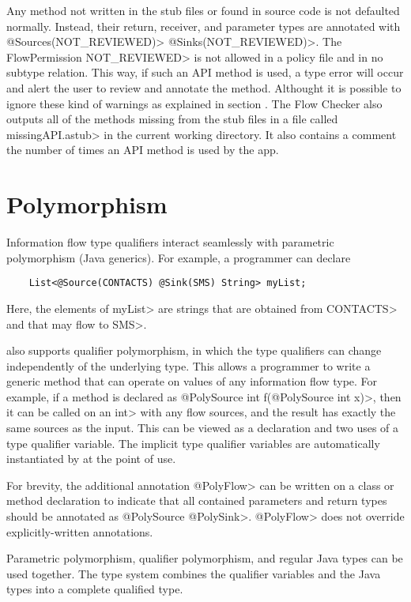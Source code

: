 Any method not written in the stub files or found in source code is not defaulted normally. 
 Instead, their return, receiver, and parameter types are annotated with \<@Sources(NOT\_REVIEWED)> 
 \<@Sinks(NOT\_REVIEWED)>.  The FlowPermission \<NOT\_REVIEWED> is not allowed 
 in a policy file and in no subtype relation.  This way, if such an API method is used, a type error
  will occur and alert the user to review and annotate the method. Althought it is possible to ignore these kind of warnings as explained in section .
  The Flow Checker also outputs all of the methods missing from the stub files in
  a file called \<missingAPI.astub> in the current working directory. It also 
  contains a comment the number of times an API method is used by the app.

\section{Polymorphism \label{sec:polyflowsources}}


Information flow type qualifiers interact seamlessly with parametric polymorphism (Java
generics).  For example, a programmer can declare

\begin{Verbatim}
    List<@Source(CONTACTS) @Sink(SMS) String> myList;
\end{Verbatim}
\noindent
Here, the elements of \<myList> are strings
that are obtained from \<CONTACTS> and that may flow to \<SMS>.

\TheFlowChecker also supports qualifier polymorphism, in
which the type qualifiers can change independently of the underlying type.
This allows a programmer to write a generic method that can operate on values of
any information flow type.
For example, if a method is declared as
\<@PolySource int f(@PolySource int x)>, then it can be called on an \<int>
with any flow sources, and the result has exactly the same sources as the
input.  This can be viewed as a declaration and two uses of a type
qualifier variable.  The implicit type qualifier variables are
automatically instantiated by \theFlowChecker at the point of use.

For brevity,
the additional
annotation \<@PolyFlow> can be written on a class or method declaration to indicate that
all contained parameters and return types should be annotated as \<@PolySource
@PolySink>.  \<@PolyFlow> does not override explicitly-written annotations.


Parametric polymorphism, qualifier polymorphism, and regular Java types can
be used together.  The type system combines the
qualifier variables and the Java types into a complete qualified type.


